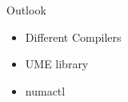\begin{frame}{Outlook} 
	\begin{itemize}
		\item Different Compilers
		\item UME library
		\item numactl
	\end{itemize}
	
\end{frame}
 
